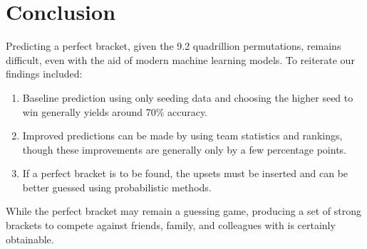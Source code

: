 \section{Conclusion}
Predicting a perfect bracket, given the 9.2 quadrillion permutations, remains difficult, even with the aid of modern machine learning models.
To reiterate our findings included:
\begin{enumerate}
	\item Baseline prediction using only seeding data and choosing the higher seed to win generally yields around 70\% accuracy.
	\item Improved predictions can be made by using team statistics and rankings, though these improvements are generally only by a few percentage points.
	\item If a perfect bracket is to be found, the upsets must be inserted and can be better guessed using probabilistic methods.
\end{enumerate}

While the perfect bracket may remain a guessing game, producing a set of strong brackets to compete against friends, family, and colleagues with is certainly obtainable.

